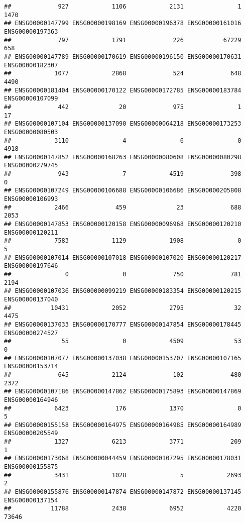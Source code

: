 \documentclass[
]{article}
\begin{document}
\begin{verbatim}
##             927            1106            2131               1            1470 
## ENSG00000147799 ENSG00000198169 ENSG00000196378 ENSG00000161016 ENSG00000197363 
##             797            1791             226           67229             658 
## ENSG00000147789 ENSG00000170619 ENSG00000196150 ENSG00000170631 ENSG00000182307 
##            1077            2868             524             648            4490 
## ENSG00000181404 ENSG00000170122 ENSG00000172785 ENSG00000183784 ENSG00000107099 
##             442              20             975               1              17 
## ENSG00000107104 ENSG00000137090 ENSG00000064218 ENSG00000173253 ENSG00000080503 
##            3110               4               6               0            4918 
## ENSG00000147852 ENSG00000168263 ENSG00000080608 ENSG00000080298 ENSG00000279745 
##             943               7            4519             398               0 
## ENSG00000107249 ENSG00000106688 ENSG00000106686 ENSG00000205808 ENSG00000106993 
##            2466             459              23             688            2053 
## ENSG00000147853 ENSG00000120158 ENSG00000096968 ENSG00000120210 ENSG00000120211 
##            7583            1129            1908               0               5 
## ENSG00000107014 ENSG00000107018 ENSG00000107020 ENSG00000120217 ENSG00000197646 
##               0               0             750             781            2194 
## ENSG00000107036 ENSG00000099219 ENSG00000183354 ENSG00000120215 ENSG00000137040 
##           10431            2052            2795              32            4475 
## ENSG00000137033 ENSG00000170777 ENSG00000147854 ENSG00000178445 ENSG00000274527 
##              55               0            4509              53               0 
## ENSG00000107077 ENSG00000137038 ENSG00000153707 ENSG00000107165 ENSG00000153714 
##             645            2124             102             480            2372 
## ENSG00000107186 ENSG00000147862 ENSG00000175893 ENSG00000147869 ENSG00000164946 
##            6423             176            1370               0               5 
## ENSG00000155158 ENSG00000164975 ENSG00000164985 ENSG00000164989 ENSG00000205549 
##            1327            6213            3771             209               1 
## ENSG00000173068 ENSG00000044459 ENSG00000107295 ENSG00000178031 ENSG00000155875 
##            3431            1028               5            2693               2 
## ENSG00000155876 ENSG00000147874 ENSG00000147872 ENSG00000137145 ENSG00000137154 
##           11788            2438            6952            4220           73646 

\end{verbatim}
\end{document}
